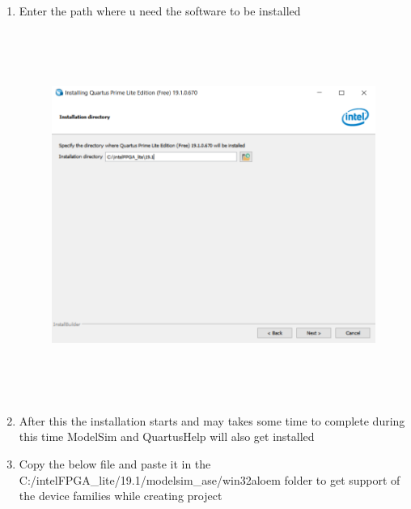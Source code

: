 \documentclass[12pt,singleside,a4paper]{article}
\begin{document}
\begin{enumerate}
\begin{figure}[H]
        \end{figure}
    \item Enter the path where u need the software to be installed 
    \begin{figure}[H]
        \centering
        \includegraphics[height = 12cm, width =12cm,keepaspectratio]{InstallationImages/Next3.png}
        \end{figure}
    \item After this the installation starts and may takes some time to complete during this time ModelSim and QuartusHelp will also get installed
    \item Copy the below file and paste it in the 
   C:/intelFPGA\_lite/19.1/modelsim\_ase/win32aloem folder to get support of the device families while creating project
    \begin{figure}[H]
        \centering

\end{figure}
\end{enumerate}
\end{document}
